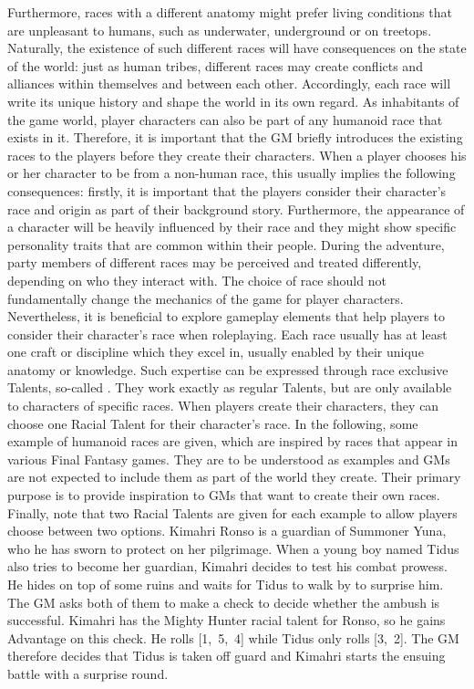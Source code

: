 Furthermore, races with a different anatomy might prefer living conditions that are unpleasant to humans, such as underwater, underground or on treetops.
Naturally, the existence of such different races will have consequences on the state of the world:
just as human tribes, different races may create conflicts and alliances within themselves and between each other.
Accordingly, each race will write its unique history and shape the world in its own regard.
%
\newpage
%
\ofpar
%
As inhabitants of the game world, player characters can also be part of any humanoid race that exists in it.
Therefore, it is important that the GM briefly introduces the existing races to the players before they create their characters.  
When a player chooses his or her character to be from a non-human race, this usually implies the following consequences:  
firstly, it is important that the players consider their character's race and origin as part of their background story.
Furthermore, the appearance of a character will be heavily influenced by their race and they might show specific personality traits that are common within their people. 
During the adventure, party members of different races may be perceived and treated differently, depending on who they interact with.
%
\vfill
%
The choice of race should not fundamentally change the mechanics of the game for player characters.
Nevertheless, it is beneficial to explore gameplay elements that help players to consider their character's race when roleplaying.
Each race usually has at least one craft or discipline which they excel in, usually enabled by their unique anatomy or knowledge.
Such expertise can be expressed through race exclusive Talents, so-called .
They work exactly as regular Talents, but are only available to characters of specific races.
When players create their characters, they can choose one Racial Talent for their character's race.
In the following, some example of humanoid races are given, which are inspired by races that appear in various Final Fantasy games.
They are to be understood as examples and GMs are not expected to include them as part of the world they create.
Their primary purpose is to provide inspiration to GMs that want to create their own races.
Finally, note that two Racial Talents are given for each example to allow players choose between two options.
%
\vfill
%
{
	Kimahri Ronso is a guardian of Summoner Yuna, who he has sworn to protect on her pilgrimage. 
	When a young boy named Tidus also tries to become her guardian, Kimahri decides to test his combat prowess.
	He hides on top of some ruins and waits for Tidus to walk by to surprise him.
	The GM asks both of them to make a check to decide whether the ambush is successful.
 	Kimahri has the Mighty Hunter racial talent for Ronso, so he gains Advantage on this check.
	He rolls [1,~5,~4] while Tidus only rolls [3,~2].
	The GM therefore decides that Tidus is taken off guard and Kimahri starts the ensuing battle with a surprise round.
}
